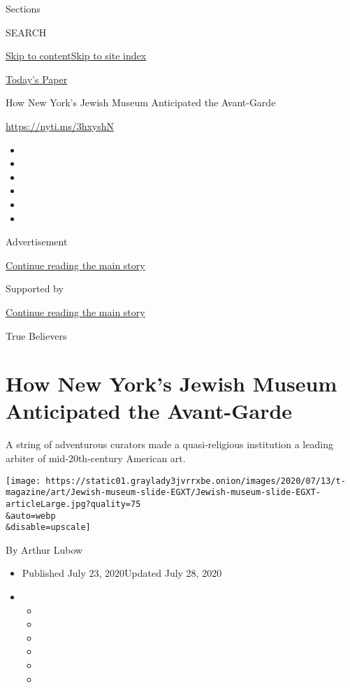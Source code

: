 Sections

SEARCH

\protect\hyperlink{site-content}{Skip to
content}\protect\hyperlink{site-index}{Skip to site index}

\href{https://myaccount.nytimes3xbfgragh.onion/auth/login?response_type=cookie\&client_id=vi}{}

\href{https://www.nytimes3xbfgragh.onion/section/todayspaper}{Today's
Paper}

How New York's Jewish Museum Anticipated the Avant-Garde

\url{https://nyti.ms/3hxyshN}

\begin{itemize}
\item
\item
\item
\item
\item
\item
\end{itemize}

Advertisement

\protect\hyperlink{after-top}{Continue reading the main story}

Supported by

\protect\hyperlink{after-sponsor}{Continue reading the main story}

True Believers

\hypertarget{how-new-yorks-jewish-museum-anticipated-the-avant-garde}{%
\section{How New York's Jewish Museum Anticipated the
Avant-Garde}\label{how-new-yorks-jewish-museum-anticipated-the-avant-garde}}

A string of adventurous curators made a quasi-religious institution a
leading arbiter of mid-20th-century American art.

\texttt{[image: https://static01.graylady3jvrrxbe.onion/images/2020/07/13/t-magazine/art/Jewish-museum-slide-EGXT/Jewish-museum-slide-EGXT-articleLarge.jpg?quality=75\\\&auto=webp\\\&disable=upscale]}

By Arthur Lubow

\begin{itemize}
\item
  Published July 23, 2020Updated July 28, 2020
\item
  \begin{itemize}
  \item
  \item
  \item
  \item
  \item
  \item
  \end{itemize}
\end{itemize}

